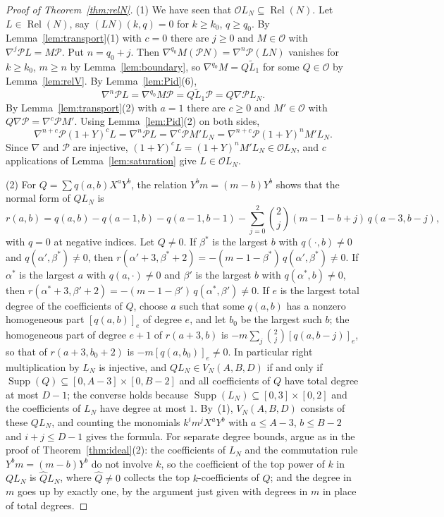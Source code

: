 \documentclass[11pt]{amsart}
\theoremstyle{definition}
\newcommand{\cO}{\mathcal{O}}
\DeclareMathOperator{\Rel}{Rel}
\DeclareMathOperator{\Supp}{Supp}
\begin{document}
\begin{proof}[Proof of Theorem~\ref{thm:relN}]
(1) We have seen that $\cO L_N\subseteq\Rel(N)$. Let $L\in\Rel(N)$, say $(LN)(k,q)=0$ for $k\ge k_0$, $q\ge q_0$. By Lemma~\ref{lem:transport}(1) with $c=0$ there are $j\ge0$ and $M\in\cO$ with $\nabla^j\mathcal PL=M\mathcal P$. Put $n=q_0+j$. Then $\nabla^{q_0}M(\mathcal PN)=\nabla^n\mathcal P(LN)$ vanishes for $k\ge k_0$, $m\ge n$ by Lemma~\ref{lem:boundary}, so $\nabla^{q_0}M=Q\widetilde L_1$ for some $Q\in\cO$ by Lemma~\ref{lem:relV}. By Lemma~\ref{lem:Pid}(6),
\[
  \nabla^n\mathcal PL=\nabla^{q_0}M\mathcal P=Q\widetilde L_1\mathcal P=Q\nabla\mathcal PL_N .
\]
By Lemma~\ref{lem:transport}(2) with $a=1$ there are $c\ge0$ and $M'\in\cO$ with $Q\nabla\mathcal P=\nabla^c\mathcal PM'$. Using Lemma~\ref{lem:Pid}(2) on both sides,
\[
  \nabla^{n+c}\mathcal P(1+Y)^cL=\nabla^n\mathcal PL=\nabla^c\mathcal PM'L_N=\nabla^{n+c}\mathcal P(1+Y)^nM'L_N .
\]
Since $\nabla$ and $\mathcal P$ are injective, $(1+Y)^cL=(1+Y)^nM'L_N\in\cO L_N$, and $c$ applications of Lemma~\ref{lem:saturation} give $L\in\cO L_N$.

(2) For $Q=\sum q(a,b)X^aY^b$, the relation $Y^bm=(m-b)Y^b$ shows that the normal form of $QL_N$ is
\[
  r(a,b)=q(a,b)-q(a-1,b)-q(a-1,b-1)-\sum_{j=0}^{2}\binom{2}{j}(m-1-b+j)\,q(a-3,b-j),
\]
with $q=0$ at negative indices. Let $Q\ne0$. If $\beta^*$ is the largest $b$ with $q(\cdot,b)\ne0$ and $q(\alpha',\beta^*)\ne0$, then $r(\alpha'+3,\beta^*+2)=-(m-1-\beta^*)\,q(\alpha',\beta^*)\ne0$. If $\alpha^*$ is the largest $a$ with $q(a,\cdot)\ne0$ and $\beta'$ is the largest $b$ with $q(\alpha^*,b)\ne0$, then $r(\alpha^*+3,\beta'+2)=-(m-1-\beta')\,q(\alpha^*,\beta')\ne0$. If $e$ is the largest total degree of the coefficients of $Q$, choose $a$ such that some $q(a,b)$ has a nonzero homogeneous part $[q(a,b)]_e$ of degree $e$, and let $b_0$ be the largest such $b$; the homogeneous part of degree $e+1$ of $r(a+3,b)$ is $-m\sum_j\binom{2}{j}[q(a,b-j)]_e$, so that of $r(a+3,b_0+2)$ is $-m[q(a,b_0)]_e\ne0$. In particular right multiplication by $L_N$ is injective, and $QL_N\in V_N(A,B,D)$ if and only if $\Supp(Q)\subseteq[0,A-3]\times[0,B-2]$ and all coefficients of $Q$ have total degree at most $D-1$; the converse holds because $\Supp(L_N)\subseteq[0,3]\times[0,2]$ and the coefficients of $L_N$ have degree at most $1$. By~(1), $V_N(A,B,D)$ consists of these $QL_N$, and counting the monomials $k^im^jX^aY^b$ with $a\le A-3$, $b\le B-2$ and $i+j\le D-1$ gives the formula. For separate degree bounds, argue as in the proof of Theorem~\ref{thm:ideal}(2): the coefficients of $L_N$ and the commutation rule $Y^bm=(m-b)Y^b$ do not involve $k$, so the coefficient of the top power of $k$ in $QL_N$ is $\hat QL_N$, where $\hat Q\ne0$ collects the top $k$-coefficients of $Q$; and the degree in $m$ goes up by exactly one, by the argument just given with degrees in $m$ in place of total degrees.
\end{proof}
\end{document}
